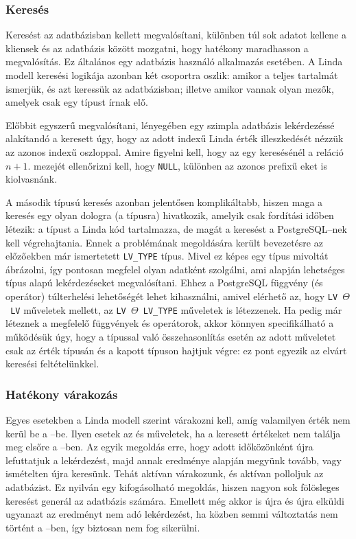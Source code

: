 
\subsubsection{Keresés}

Keresést az adatbázisban kellett megvalósítani, különben túl sok adatot kellene a kliensek és az adatbázis között mozgatni, hogy hatékony maradhasson a megvalósítás.
Ez általános egy adatbázis használó alkalmazás esetében.
A Linda modell keresési logikája azonban két csoportra oszlik: amikor a teljes \nes{} tartalmát ismerjük, és azt keressük az adatbázisban; illetve amikor vannak olyan mezők, amelyek csak egy típust írnak elő.

Előbbit egyszerű megvalósítani, lényegében egy szimpla adatbázis lekérdezéssé alakítandó a keresett \nes{} úgy, hogy az adott indexű Linda érték illeszkedését nézzük az azonos indexű oszloppal.
Amire figyelni kell, hogy az egy \nes{} keresésénél a reláció $n + 1$. mezejét ellenőrizni kell, hogy \texttt{NULL}, különben az azonos prefixű \nes{}eket is kiolvasnánk.

A második típusú keresés azonban jelentősen komplikáltabb, hiszen maga a keresés egy olyan dologra (a típusra) hivatkozik, amelyik csak fordítási időben létezik: a típust a Linda kód tartalmazza, de magát a keresést a PostgreSQL--nek kell végrehajtania.
Ennek a problémának megoldására került bevezetésre az előzőekben már ismertetett \texttt{LV\_TYPE} típus.
Mivel ez képes egy típus mivoltát ábrázolni, így pontosan megfelel olyan adatként szolgálni, ami alapján lehetséges típus alapú lekérdezéseket megvalósítani.
Ehhez a PostgreSQL függvény (és operátor) túlterhelési lehetőségét lehet kihasználni, amivel elérhető az, hogy \texttt{LV~$\Theta$~LV} műveletek mellett, az \texttt{LV~$\Theta$~LV\_TYPE} műveletek is létezzenek.
Ha pedig már léteznek a megfelelő függvények és operátorok, akkor könnyen specifikálható a működésük úgy, hogy a típussal való összehasonlítás esetén az adott műveletet csak az érték típusán és a kapott típuson hajtjuk végre: ez pont egyezik az elvárt keresési feltételünkkel.

\subsubsection{Hatékony várakozás}

Egyes esetekben a Linda modell szerint várakozni kell, amíg valamilyen érték nem kerül be a \ts--be.
Ilyen esetek az  és  műveletek, ha a keresett értékeket nem találja meg elsőre a \ts--ben.
Az egyik megoldás erre, hogy adott időközönként újra lefuttatjuk a lekérdezést, majd annak eredménye alapján megyünk tovább, vagy ismételten újra keresünk.
Tehát aktívan várakozunk, és aktívan polloljuk az adatbázist.
Ez nyilván egy kifogásolható megoldás, hiszen nagyon sok fölösleges keresést generál az adatbázis számára.
Emellett még akkor is újra és újra elküldi ugyanazt az eredményt nem adó lekérdezést, ha közben semmi változtatás nem történt a \ts--ben, így biztosan nem fog sikerülni.

